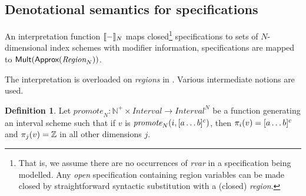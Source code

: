 \documentclass[acmlarge,review,anonymous]{acmart}\settopmatter{printfolios=true}
\theoremstyle{definition}
\newtheorem{defn}{Definition}
\theoremstyle{plain}
\theoremstyle{remark}
\begin{document}
\subsection{Denotational semantics for specifications}
\label{sec:semantics}

\noindent
An interpretation function $\llbracket{} {-} \rrbracket{}_N$ maps closed\footnote{That
  is, we assume there are no occurrences of \textit{rvar} in a
  specification being modelled.  Any \emph{open} specification
  containing region variables can be made closed by straightforward
  syntactic substitution with a (closed) \textit{region}.}
specifications to sets of $N$-dimensional index schemes with modifier
information, \ie{} specifications are mapped to
$\textsf{Mult} (\textsf{Approx} (\textnormal{$\textit{Region}_{N}$}))$.

The interpretation is overloaded on \emph{regions} in
. Various intermediate notions are used.

\begin{defn}
  Let $\textit{promote}_N : \mathbb{N}^+ \times \textit{Interval} \to
  \textit{Interval}^N$ be a function generating an interval scheme such that if
  $v$ is $\textnormal{$\textit{promote}_{N}(i,\textnormal{$\lbrack a\ldots b\rbrack^{c}$})$}$, then $\pi_i(v) = \textnormal{$\lbrack a\ldots b\rbrack^{c}$}$
  and $\pi_j(v) = \textnormal{$\mathbb{Z}$}{}$ in all other dimensions $j$.
\end{defn}
\end{document}
